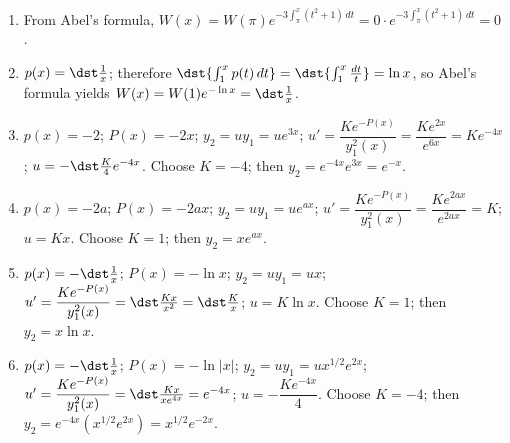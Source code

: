 \documentclass[openany]{book}
\newenvironment{sectionSolutions}{
 \begin{enumerate}[item-label={\thesection.\arabic{enumi}.}]
}{
 \end{enumerate}
}
\begin{document}
\begin{sectionSolutions}

\item From Abel's formula,
$W(x)=W(\pi)e^{-3\int_\pi^x (t^2+1)\,dt}=0\cdot
e^{-3\int_\pi^x (t^2+1)\,dt}=0$.


\item
$p(x)=\dst\frac{1}{ x}$; therefore $\dst{\int_1^x
p(t)\,dt}=\dst{\int_1^x\frac{dt}{ t}}=\ln x$, so Abel's
formula yields $W(x)=W(1)e^{-\ln x}=\dst\frac{1}{ x}$.

\item
$p(x)=-2$;\;
$P(x)=-2x$;\;
$y_2=uy_1=ue^{3x}$;\;
$u'=\dfrac{Ke^{-P(x)}}{ y_1^2(x)}=\dfrac{Ke^{2x}}{
e^{6x}}=Ke^{-4x}$;\;
$u=-\dst\frac{K}{4}e^{-4x}$.
Choose $K=-4$;  then
$y_2=e^{-4x}e^{3x}=e^{-x}$.


\item
$p(x)=-2a$;\;
$P(x)=-2ax$;\;
$y_2=uy_1=ue^{ax}$;\;
$u'=\dfrac{Ke^{-P(x)}}{ y_1^2(x)}=\dfrac{Ke^{2ax}}{ e^{2ax}}=K$;\;
$u=Kx$.
Choose $K=1$; then
$y_2=xe^{ax}$.

\item
$p(x)=-\dst\frac{1}{ x}$;\;
$P(x)=-\ln x$;\;
$y_2=uy_1=ux$;\;
$u'=\dfrac{Ke^{-P(x)}}{ y_1^2(x)}=\dst\frac{Kx}{
x^2}=\dst\frac{K}{ x}$;\;
$u=K\ln x$.
Choose $K=1$; then
$y_2=x\ln x$.


\item
$p(x)=-\dst\frac{1}{ x}$;\;
$P(x)=-\ln|x|$;\;
$y_2=uy_1=ux^{1/2}e^{2x}$;\;
$u'=\dfrac{Ke^{-P(x)}}{ y_1^2(x)}=\dst\frac{Kx}{ xe^{4x}}=e^{-4x}$;\;
$u=-\dfrac{Ke^{-4x}}{4}$.
Choose $K=-4$; then
$y_2=e^{-4x}(x^{1/2}e^{2x})=x^{1/2}e^{-2x}$.



\end{sectionSolutions}
\end{document}

